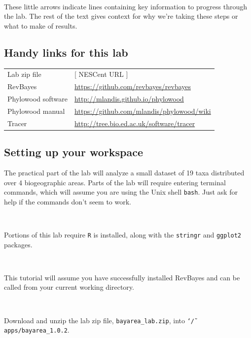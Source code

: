 \documentclass[11pt]{article}
\newcommand{\impmark}{\strut\vadjust{\domark}}
\newcommand{\domark}{%
  \vbox to 0pt{
    \kern-\dp\strutbox
    \smash{\llap{$\rightarrow$\kern1em}}
    \vss
  }%
}
\begin{document}
\noindent \\ \impmark These little arrows indicate lines containing key information to progress through the lab. The rest of the text gives context for why we're taking these steps or what to make of results.

\subsection{Handy links for this lab}

\begin{tabular}{ll}
Lab zip file & [ NESCent URL ] \\
RevBayes & \url{https://github.com/revbayes/revbayes} \\
Phylowood software & \url{http://mlandis.github.io/phylowood} \\
Phylowood manual & \url{https://github.com/mlandis/phylowood/wiki} \\
Tracer & \url{http://tree.bio.ed.ac.uk/software/tracer}

\end{tabular}

\subsection{Setting up your workspace}

The practical part of the lab will analyze a small dataset of 19 taxa distributed over 4 biogeographic areas.
Parts of the lab will require entering terminal commands, which will assume you are using the Unix shell \texttt{bash}.
Just ask for help if the commands don't seem to work.

\noindent \\ \impmark Portions of this lab require {\tt R} is installed, along with the {\tt stringr} and {\tt ggplot2} packages.

\noindent \\ \impmark This tutorial will assume you have successfully installed RevBayes and can be called from your current working directory.

\noindent \\ \impmark Download and unzip the lab zip file, \texttt{bayarea\_lab.zip}, into \texttt{\char`\~/apps/bayarea\_1.0.2}.
\end{document}

